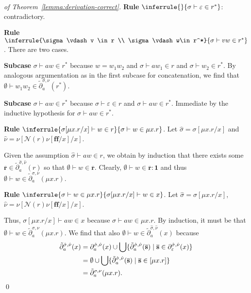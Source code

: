 \documentclass[runningheads, envcountsame, a4paper]{llncs}
\newcommand{\False}{\ensuremath{\mathbf{ff}}}%
\newcommand\pderiv[3][{}]{\partial^{#1}_{#3}(#2)}
\newcommand\cderiv[3][{}]{\tilde\partial^{#1}_{#3}(#2)}
\newcommand\Rnull{\mathbf0}
\newcommand\Rempty{\mathbf1}
\newcommand\PUSH{:}
\newcommand\SINGLETON[1]{{[#1]}}
\newcommand\Null{\mathcal{N}}
\newcommand\RS{\ensuremath{\overline{\mathbf{r}}}}
\renewcommand\SS{\ensuremath{\overline{\mathbf{s}}}}
\begin{document}
\begin{proof}[of Theorem~\ref{lemma:derivation-correct}]
  \textbf{Rule }$\inferrule{}{\sigma \vdash \varepsilon \in r^*}$:
  contradictory.

  \textbf{Rule }$\inferrule{\sigma \vdash v \in r \\ \sigma\vdash w\in r^*}{\sigma
    \vdash vw \in r^*}$.  There are two cases.

  \textbf{Subcase }$\sigma \vdash aw \in r^*$ because $w=w_1w_2$ and
  $\sigma \vdash aw_1 \in r$ and $\sigma \vdash w_2 \in r^*$. By
  analogous argumentation as in the first subcase for concatenation,
  we find that $\emptyset \vdash w_1w_2 \in \cderiv[\sigma,
  \nu]{r^*}{a}$.

  \textbf{Subcase }$\sigma \vdash  aw \in r^*$ because $\sigma \vdash
  \varepsilon \in r$ and $\sigma \vdash aw \in r^*$. Immediate by the
  inductive hypothesis for  $\sigma \vdash aw \in r^*$.

  \textbf{Rule }$\inferrule{\sigma[\mu x. r/x] \vdash w \in r}{\sigma \vdash w \in
    \mu x.r}$.
  Let $\hat\sigma = \sigma[\mu x. r/x]$
  and $\hat\nu = \nu[\Null (r)\nu[ \False/x]/x]$.

  Given the assumption $\hat\sigma \vdash aw \in r$, we obtain
  by induction that there exists some $\RS\in \cderiv[\hat\sigma,
  \hat\nu]{r}{a}$ so that $\emptyset \vdash w \in \RS$. Clearly,
  $\emptyset \vdash w \in \RS \PUSH \Rempty$  and thus  $\emptyset \vdash w
  \in \cderiv[\sigma,  \nu]{\mu x.r}{a}$.

  \textbf{Rule }$\inferrule{\sigma \vdash w\in \mu x.r }{ \sigma[\mu x. r/x]
    \vdash w \in x}$.   Let $\hat\sigma = \sigma[\mu x. r/x]$, $\hat\nu =
  \nu[\Null (r)\nu[ \False/x]/x]$.

  Thus, $\sigma[\mu x. r/x] \vdash aw \in x$ because $\sigma \vdash aw
  \in \mu x.r$. 
  By induction, it must be that $\emptyset \vdash w \in
  \cderiv[\sigma,\nu]{\mu x.r}{a}$.
  We find that also $\emptyset \vdash w \in
  \cderiv[\hat\sigma,\hat\nu]{x}{a}$ because
  \begin{align*}
    \cderiv[\hat\sigma,\hat\nu]{ x}{a}
    &=
    \pderiv[\hat\sigma,\hat\nu]{ x}{a} \cup \bigcup \{
    \cderiv[\hat\sigma,\hat\nu]{\SS}{a} \mid \SS \in
    \pderiv[\hat\sigma,\hat\nu]{x}{\varepsilon}\}
    \\&=
    \emptyset \cup \bigcup \{
    \cderiv[\hat\sigma,\hat\nu]{\SS}{a} \mid \SS \in
    \SINGLETON{\mu x.r}\}
    \\&=
    \cderiv[\sigma,\nu]{\mu x.r}{a}
    \text.
  \end{align*}
  \qed
\end{proof}
\end{document}
